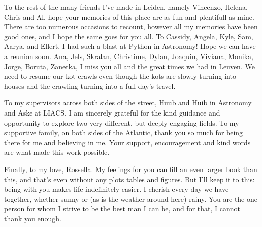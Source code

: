 \begin{thesisacknowledgements}
    To the rest of the many friends I've made in Leiden, namely Vincenzo, Helena, Chris and Al, hope your memories of this place are as fun and plentifull as mine. There are too numerous occasions to recount, however all my memories have been good ones, and I hope the same goes for you all. To Cassidy, Angela, Kyle, Sam, Aarya, and Ellert, I had such a blast at Python in Astronomy! Hope we can have a reunion soon. Ana, Jels, Skralan, Christime, Dylan, Joaquin, Viviana, Monika, Jorge, Boruta, Zanetka, I miss you all and the great times we had in Leuven. We need to resume our kot-crawls even though the kots are slowly turning into houses and the crawling turning into a full day's travel. 

    To my supervisors across both sides of the street, Huub and Huib in Astronomy and Aske at LIACS, I am sincerely grateful for the kind guidance and opportunity to explore two very different, but deeply engaging fields. To my supportive family, on both sides of the Atlantic, thank you so much for being there for me and believing in me. Your support, encouragement and kind words are what made this work possible. 

    Finally, to my love, Rossella. My feelings for you can fill an even larger book than this, and that's even without any plots tables and figures. But I'll keep it to this: being with you makes life indefinitely easier. I cherish every day we have together, whether sunny or (as is the weather around here) rainy. You are the one person for whom I strive to be the best man I can be, and for that, I cannot thank you enough.  

\end{thesisacknowledgements}

